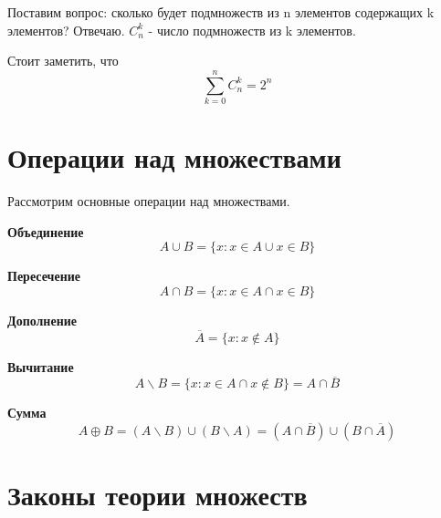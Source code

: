 Поставим вопрос: сколько будет подмножеств из n элементов содержащих k элементов? Отвечаю.
$C^{k}_n$ - число подмножеств из k элементов.

Стоит заметить, что
\begin{equation}
    \sum_{k=0}^{n} C^{k}_n = 2^{n}
\end{equation}

\section{Операции над множествами}

Рассмотрим основные операции над множествами.

\textbf{Объединение} 
\begin{equation}
    A \cup B = \{x: x \in A \cup x \in B\}
\end{equation}

\textbf{Пересечение} 
\begin{equation}
    A \cap B = \{x: x \in A \cap x \in B\}
\end{equation}

\textbf{Дополнение} 
\begin{equation}
    \overline A = \{x: x \notin A\}
\end{equation}

\textbf{Вычитание} 
\begin{equation}
    A \backslash B = \{x: x \in A \cap x \notin B\} = A \cap \overline B
\end{equation}

\textbf{Сумма} 
\begin{equation}
    A \oplus B = (A \backslash B) \cup (B \backslash A) = (A \cap \overline B) \cup (B \cap \overline A)
\end{equation}


\section{Законы теории множеств}

